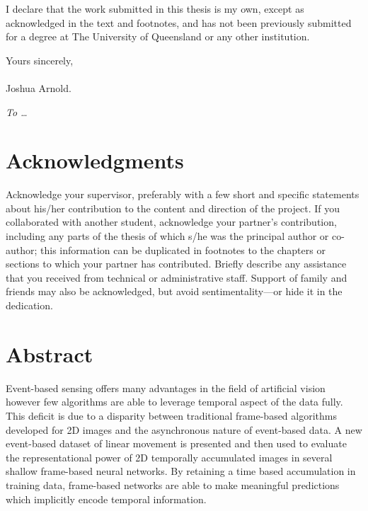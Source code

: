 \documentclass[12pt,openany,a4paper]{book}
\renewcommand{\baselinestretch}{1.2}	%
\begin{document}
I declare that the work submitted in this thesis is my own, except as
acknowledged in the text and footnotes, and has not been previously
submitted for a degree at The University of Queensland or any other
institution.

\begin{flushright}
	Yours sincerely,\\
	\medskip
	\emph{}\\
	\medskip
	Joshua Arnold.
\end{flushright}

\cleardoublepage

\vspace*{70mm}
\begin{center}
\renewcommand{\baselinestretch}{1.0}
\sl
	To \ldots
\end{center}

\chapter{Acknowledgments}


Acknowledge your supervisor, preferably with a few short and specific
statements about his/her contribution to the content and direction of
the project.  If you collaborated with another student, acknowledge
your partner's contribution, including any parts of the thesis of
which s/he was the principal author or co-author; this information can
be duplicated in footnotes to the chapters or sections to which your
partner has contributed.  Briefly describe any assistance that you
received from technical or administrative staff.  Support of family
and friends may also be acknowledged, but avoid sentimentality---or
hide it in the dedication.

\cleardoublepage

\chapter{Abstract}

Event-based sensing offers many advantages in the field of artificial vision however few algorithms are able to leverage temporal aspect of the data fully. 
This deficit is due to a disparity between traditional frame-based algorithms developed for 2D images and the asynchronous nature of event-based data. 
A new event-based dataset of linear movement is presented and then used to evaluate the representational power of 2D temporally accumulated images in several shallow frame-based neural networks. 
By retaining a time based accumulation in training data, frame-based networks are able to make meaningful predictions which implicitly encode temporal information. 
\end{document}
